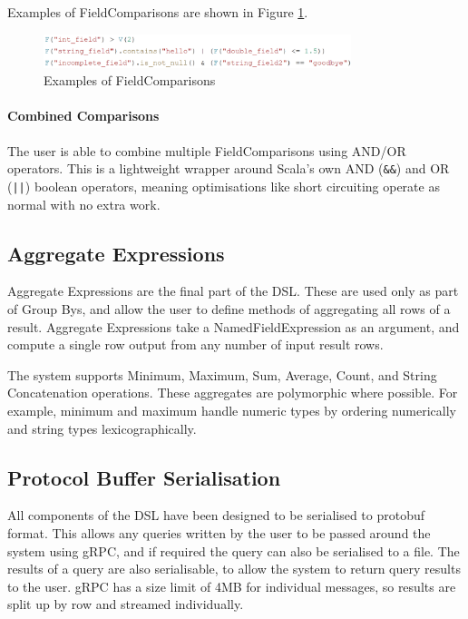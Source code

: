 Examples of FieldComparisons are shown in Figure \ref{fig:field-comparisons-examples}.

\begin{figure}[h]
	\centering
	\includegraphics[width=0.8\textwidth]{chapters/diagrams/implementation/field-comparisons-examples}
	\caption{Examples of FieldComparisons}
	\label{fig:field-comparisons-examples}
\end{figure}

\paragraph{Combined Comparisons}
The user is able to combine multiple FieldComparisons using AND/OR operators. This is a lightweight wrapper around Scala's own AND (\texttt{\&\&}) and OR (\texttt{||}) boolean operators, meaning optimisations like short circuiting operate as normal with no extra work.

\subsection{Aggregate Expressions}
Aggregate Expressions are the final part of the DSL. These are used only as part of Group Bys, and allow the user to define methods of aggregating all rows of a result. Aggregate Expressions take a NamedFieldExpression as an argument, and compute a single row output from any number of input result rows.

The system supports Minimum, Maximum, Sum, Average, Count, and String Concatenation operations. These aggregates are polymorphic where possible. For example, minimum and maximum handle numeric types by ordering numerically and string types lexicographically.


\subsection{Protocol Buffer Serialisation}
All components of the DSL have been designed to be serialised to protobuf format. This allows any queries written by the user to be passed around the system using gRPC, and if required the query can also be serialised to a file. The results of a query are also serialisable, to allow the system to return query results to the user. gRPC has a size limit of 4MB for individual messages, so results are split up by row and streamed individually.

